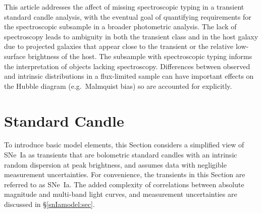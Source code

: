 \documentclass[preprint,3p]{elsarticle}
\begin{document}
This article addresses the affect of missing spectroscopic typing in
a transient standard candle analysis, with the eventual goal of quantifying
requirements for the spectroscopic subsample in a broader photometric analysis.
The lack of spectroscopy leads to ambiguity in both the transient class and
in the host galaxy due to projected galaxies that appear close to the transient or
the relative low-surface brightness of the host.  The subsample with
spectroscopic typing informs the interpretation of objects lacking spectroscopy.
Differences between observed and
intrinsic distributions in a flux-limited sample can have important effects on the Hubble
diagram  (e.g.\ Malmquist bias) so are accounted for explicitly.

\section{Standard Candle}
To introduce basic model elements, this Section considers a
simplified view of SNe~Ia
as transients that are bolometric standard candles with an intrinsic random
dispersion
at peak brightness, and assumes data with negligible measurement uncertainties.
For convenience,
the transients
in this Section are  referred to as SNe~Ia.
The added complexity of correlations between absolute magnitude
and multi-band light curves, and measurement uncertainties
are discussed in
\S\ref{snIamodel:sec}. 
\end{document}
